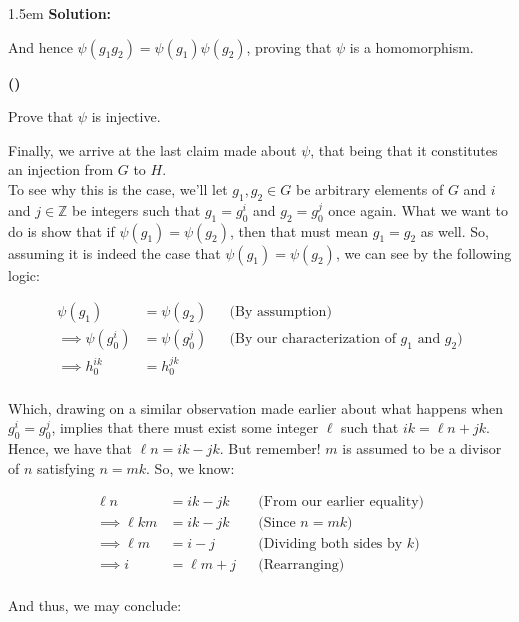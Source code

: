 \documentclass{article}
\newenvironment{solution}{
	\vspace{.5em}
	\par
	\begin{adjustwidth}{1.5em}{}
	\textbf{{Solution:}}
	\par
	\vspace{.5em}
}{
	\vspace{1em}
	\end{adjustwidth}
	\setcounter{step}{0}
	\newpage
}
\newcounter{step}
\renewcommand{\thestep}{\Roman{step}}
\newenvironment{step}{
	\refstepcounter{step}
	\vspace{1em}\par\noindent
	\ignorespaces\noindent\textbf{(\thestep)}
	\ignorespaces
}{
	\par
	\vspace{1.5em}
}
\begin{document}
\begin{solution}
	And hence $\psi(g_{1}g_{2}) = \psi(g_{1})\psi(g_{2})$, proving that $\psi$ is a homomorphism.

	\begin{step}
		Prove that $\psi$ is injective.
	\end{step}

	Finally, we arrive at the last claim made about $\psi$, that being that it constitutes an injection from $G$ to $H$. \\

	To see why this is the case, we'll let $g_{1}, g_{2} \in G$ be arbitrary elements of $G$ and $i$ and $j \in \mathbb{Z}$ be integers such that $g_{1} = g_{0}^{i}$ and $g_{2} = g_{0}^{j}$ once again. What we want to do is show that if $\psi(g_{1}) = \psi(g_{2})$, then that must mean $g_{1} = g_{2}$ as well. So, assuming it is indeed the case that $\psi(g_{1}) = \psi(g_{2})$, we can see by the following logic:

	\begin{align*}
		\psi(g_{1}) &= \psi(g_{2}) &&\text{(By assumption)} \\
		\implies \psi(g_{0}^{i}) &= \psi(g_{0}^{j}) &&\text{(By our characterization of $g_{1}$ and $g_{2}$)} \\
		\implies h_{0}^{ik} &= h_{0}^{jk} \\
	\end{align*}

	Which, drawing on a similar observation made earlier about what happens when $g_{0}^{i} = g_{0}^{j}$, implies that there must exist some integer $\ell$ such that $ik = \ell n + jk$. Hence, we have that $\ell n = ik - jk$. But remember! $m$ is assumed to be a divisor of $n$ satisfying $n = mk$. So, we know:

	\begin{align*}
		\ell n &= ik - jk &&\text{(From our earlier equality)} \\
		\implies \ell km &= ik - jk &&\text{(Since $n = mk$)} \\
		\implies \ell m &= i - j &&\text{(Dividing both sides by $k$)} \\
		\implies i &= \ell m + j &&\text{(Rearranging)} \\
	\end{align*}

	And thus, we may conclude:


\end{solution}
\end{document}
